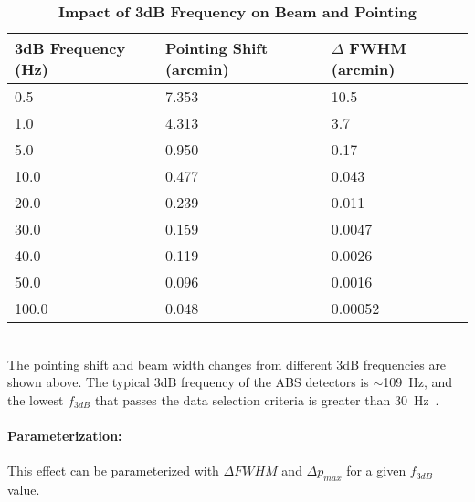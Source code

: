\begin{table}[h!] 
\begin{center}
  \caption {\textbf{Impact of 3dB Frequency on Beam and Pointing}}\label{table:tc_shift}
\begin{tabular}{|l|l|l|}
  \hline                        
  \textbf{3dB Frequency (Hz)} &  \textbf{Pointing Shift (arcmin)} &  \textbf{$\Delta$ FWHM (arcmin)} \\
  \hline
  0.5 & 7.353 & 10.5 \\
  \hline
  1.0 & 4.313 & 3.7 \\
  \hline
  5.0 & 0.950 & 0.17 \\
 \hline  
  10.0 & 0.477 & 0.043 \\
 \hline  
  20.0 & 0.239 & 0.011 \\
 \hline  
  30.0 & 0.159 & 0.0047 \\
 \hline  
  40.0 & 0.119 & 0.0026 \\
 \hline  
  50.0 & 0.096 & 0.0016 \\
 \hline  
  100.0 & 0.048 & 0.00052 \\
 \hline  
\end{tabular}\\
The pointing shift and beam width changes from different 3dB frequencies are shown above. The typical 3dB frequency of the ABS detectors is $\sim$109~Hz, and the lowest $f_{3dB}$ that passes the data selection criteria is greater than 30~Hz~\cite{Simon_Thesis_2016}.
\end{center}
\end{table}

\paragraph{Parameterization:}
This effect can be parameterized with $\Delta FWHM$ and $\Delta p_{max}$ for a given $f_{3dB}$ value.
